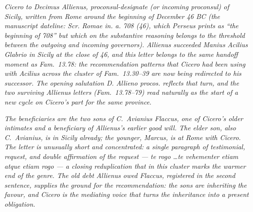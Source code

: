 
\textit{Cicero to Decimus Allienus, proconsul-designate (or
incoming proconsul) of Sicily, written from Rome around
the beginning of December 46 BC (the manuscript dateline:
\textit{Scr. Romae in. a. 708 (46)}, which Perseus prints
as ``the beginning of 708'' but which on the substantive
reasoning belongs to the threshold between the outgoing
and incoming governors). Allienus succeeded Manius
Acilius Glabrio in Sicily at the close of 46, and this
letter belongs to the same handoff moment as Fam.\ 13.78:
the recommendation patterns that Cicero had been using
with Acilius across the cluster of Fam.\ 13.30--39 are now
being redirected to his successor. The opening salutation
\textit{D. Allieno procos.} reflects that turn, and the
two surviving Allienus letters (Fam.\ 13.78--79) read
naturally as the start of a new cycle on Cicero's part
for the same province.}

\textit{The beneficiaries are the two sons of C.\ Avianius
Flaccus, one of Cicero's older intimates and a
beneficiary of Allienus's earlier good will. The elder
son, also C.\ Avianius, is in Sicily already; the
younger, Marcus, is at Rome with Cicero. The letter is
unusually short and concentrated: a single paragraph of
testimonial, request, and double affirmation of the
request --- \textit{te rogo} \dots \textit{te vehementer
etiam atque etiam rogo} --- a closing reduplication that
in this cluster marks the warmer end of the genre. The
old debt Allienus owed Flaccus, registered in the second
sentence, supplies the ground for the recommendation: the
sons are inheriting the favour, and Cicero is the
mediating voice that turns the inheritance into a
present obligation.}
